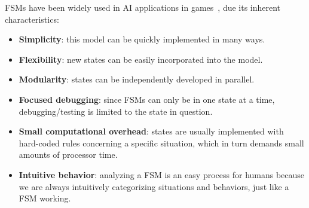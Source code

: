 FSMs have been widely used in AI applications in games~\cite{millington_2009}, due 
its inherent characteristics:

\begin{itemize}
	\item \textbf{Simplicity}: this model can be quickly implemented in many ways.
	
	\item \textbf{Flexibility}: new states can be easily incorporated into the model.
	
	\item \textbf{Modularity}: states can be independently developed in parallel.
	
	\item \textbf{Focused debugging}: since FSMs can only be in one state at a time,
	debugging/testing is limited to the state in question.
	
	\item \textbf{Small computational overhead}: states are usually implemented 
	with hard-coded rules concerning a specific situation, which in turn demands
	small amounts of processor time.
	
	\item \textbf{Intuitive behavior}: analyzing a FSM is an easy process for 
	humans because we are always intuitively categorizing situations and behaviors,
	just like a FSM working. 
\end{itemize}
